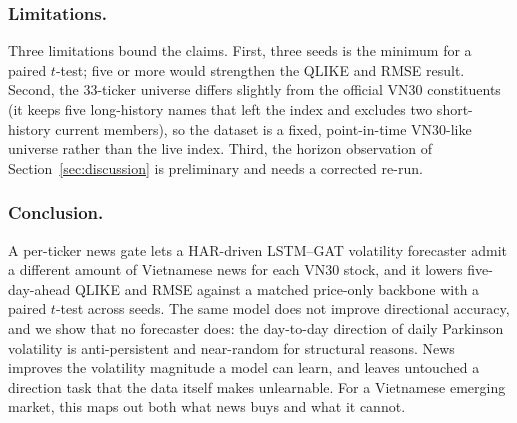 \documentclass[runningheads]{llncs}
\newcommand{\ntick}{33}
\begin{document}
\subsubsection{Limitations.}
Three limitations bound the claims. First, three seeds is the minimum for a paired $t$-test; five or
more would strengthen the QLIKE and RMSE result. Second, the \ntick{}-ticker universe differs
slightly from the official VN30 constituents (it keeps five long-history names that left the index
and excludes two short-history current members), so the dataset is a fixed, point-in-time VN30-like
universe rather than the live index. Third, the horizon observation of Section~\ref{sec:discussion}
is preliminary and needs a corrected re-run.

\subsubsection{Conclusion.}
A per-ticker news gate lets a HAR-driven LSTM--GAT volatility forecaster admit a different amount of
Vietnamese news for each VN30 stock, and it lowers five-day-ahead QLIKE and RMSE against a matched
price-only backbone with a paired $t$-test across seeds. The same model does not improve directional
accuracy, and we show that no forecaster does: the day-to-day direction of daily Parkinson
volatility is anti-persistent and near-random for structural reasons. News improves the volatility
magnitude a model can learn, and leaves untouched a direction task that the data itself makes
unlearnable. For a Vietnamese emerging market, this maps out both what news buys and what it cannot.

\end{document}
